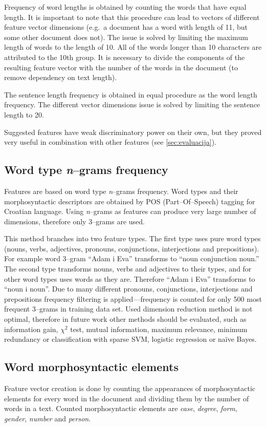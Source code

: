 \documentclass[11pt,english]{article}
\begin{document}
\begin{multicols}{2}
Frequency of word lengths is obtained by counting the words that have equal
length. It is important to note that this procedure can lead to vectors of
different feature vector dimensions (e.g.\ a document has a word with length of 11,
but some other document does not). The issue is solved by limiting the maximum
length of words to the length of 10. All of the words longer than 10 characters are
attributed to the 10th group. It is necessary to divide the components of the resulting feature
vector with the number of the words in the document (to remove dependency on text length).

The sentence length frequency is obtained in equal procedure as the word
length frequency. The different vector dimensions issue is solved by limiting
the sentence length to 20.

Suggested features have weak discriminatory power on their own, but they proved
very useful in combination with other features (see \ref{sec:evaluacija}).

\subsection{Word type \emph{n}--grams frequency}
\label{sec:ngrami-tipova}
Features are based on word type \emph{n}--grams frequency. Word types and their
morphosyntactic descriptors are obtained by POS (Part--Of--Speech) tagging for
Croatian language. Using \emph{n}--grams as features can produce very large
number of dimensions, therefore only 3--grams are used.

This method branches into two feature types. The first type uses pure word types (nouns,
verbs, adjectives, pronouns, conjunctions, interjections and prepositions). For
example word 3--gram ``Adam i Eva'' transforms to ``noun conjunction noun.''
The second type transforms nouns, verbs and adjectives to their types, and for other
word types uses words as they are. Therefore ``Adam i Eva'' transforms to
``noun i noun''. Due to many different pronouns, conjunctions, interjections and
prepositions frequency filtering is applied---frequency is counted for only 500
most frequent 3--grams in training data set. Used dimension reduction method is
not optimal, therefore in future work other methods should be evaluated, such as
information gain, $\chi^2$ test, mutual information, maximum relevance, minimum
redundancy or classification with sparse SVM, logistic regression or na\"ive
Bayes.

\subsection{Word morphosyntactic elements}
\label{sec:morphosyntactic}
Feature vector creation is done by counting the appearances of morphosyntactic
elements for every word in the document and dividing them by the number of words in a text.
Counted morphosyntactic elements are \emph{case}, \emph{degree}, \emph{form},
\emph{gender}, \emph{number} and \emph{person}.


\end{multicols}
\end{document}
